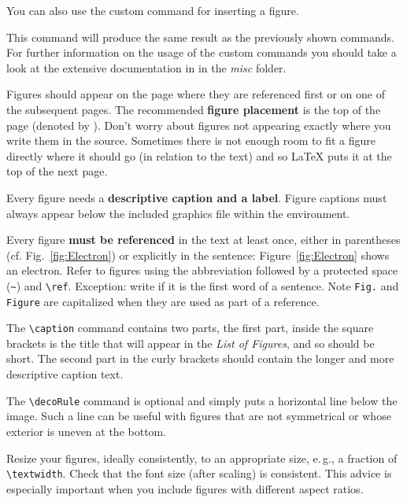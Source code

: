 You can also use the custom command  for inserting a figure.

\begin{latex}
\end{latex}

This command will produce the same result as the previously shown commands.
For further information on the usage of the custom commands you should take a look at the extensive documentation in  in the \emph{misc} folder.

Figures should appear on the page where they are referenced first or on one of the subsequent pages. The recommended \textbf{figure placement} is the top of the page (denoted by \code{[t]}). Don't worry about figures not appearing exactly where you write them in the source. Sometimes there is not enough room to fit a figure directly where it should go (in relation to the text) and so LaTeX puts it at the top of the next page.

Every figure needs a \textbf{descriptive caption and a label}. Figure captions must always appear below the included graphics file within the  environment.

Every figure \textbf{must be referenced} in the text at least once, either in parentheses (cf. Fig.~\ref{fig:Electron}) or explicitly in the sentence: Figure~\ref{fig:Electron} shows an electron. Refer to figures using the abbreviation  followed by a protected space (\verb|~|) and \verb|\ref|. Exception: write  if it is the first word of a sentence. Note \verb|Fig.| and \verb|Figure| are capitalized when they are used as part of a reference.

The \verb|\caption| command contains two parts,
the first part, inside the square brackets%
is the title that will appear in the \emph{List of Figures}, and so should be short.
 The second part in the curly brackets should contain the longer and more descriptive caption text.

The \verb|\decoRule| command is optional and simply puts a horizontal line below the image. Such a line can be useful with figures that are not symmetrical or whose exterior is uneven at the bottom.

Resize your figures, ideally consistently, to an appropriate size, e.\,g., a fraction of \texttt{\textbackslash textwidth}. Check that the font size (after scaling) is consistent. This advice is especially important when you include figures with different aspect ratios.

